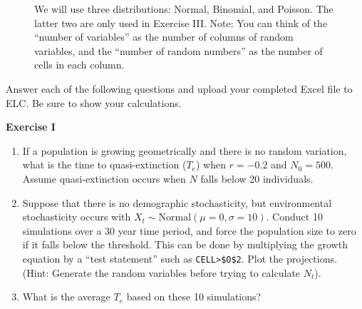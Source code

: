 \documentclass[12pt]{article}\usepackage[]{graphicx}\usepackage[]{color}
\begin{document}
\vspace{1cm}

\begin{figure}[h]
  \centering
  \caption{\footnotesize We will use three distributions: Normal,
    Binomial, and Poisson. The latter two are only used in Exercise
    III. Note: You can think of the ``number of variables'' as the
    number of columns of random variables, and the ``number of random
    numbers'' as the number of cells in each column.}
  \label{fig:rng-3}
\end{figure}


\clearpage

Answer each of the following questions and upload your completed Excel
file to ELC. Be sure to show your calculations. \\

\vspace{12pt}

{\bf Exercise I \\}
\begin{enumerate}
  \item If a population is growing geometrically and there is no
    random variation, what is the time to quasi-extinction ($T_e$) when
    $r=-0.2$ and $N_0=500$. Assume quasi-extinction occurs when $N$ falls
    below 20 individuals.
  \item Suppose that there is no demographic stochasticity,
    but environmental stochasticity occurs with $X_t \sim
    \mathrm{Normal}(\mu=0, \sigma=10)$. Conduct 10 simulations over a
    30 year time period, and force the population size to zero if it
    falls below the threshold. This can be done by multiplying the
    growth equation by a ``test statement'' such as
    \verb+CELL>$O$2+. Plot the projections. (Hint: Generate the random
    variables before trying to calculate $N_t$).
  \item What is the average $T_e$ based on these 10 simulations?
\end{enumerate}
\end{document}
